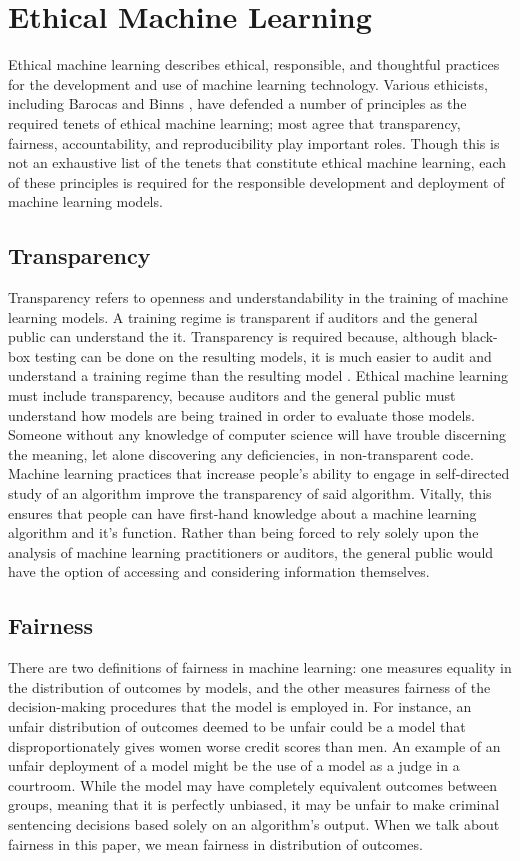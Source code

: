 \documentclass[letterpaper]{article}
\newcommand{\citep}[1]{\cite{#1}}
\begin{document}
\section{Ethical Machine Learning}
Ethical machine learning describes ethical, responsible, and thoughtful practices for the development and use of machine learning technology. Various ethicists, including Barocas  and Binns , have defended a number of principles as the required tenets of ethical machine learning; most agree that transparency, fairness, accountability, and reproducibility play important roles. Though this is not an exhaustive list of the tenets that constitute ethical machine learning, each of these principles is required for the responsible development and deployment of machine learning models.

\subsection{Transparency}
Transparency refers to openness and understandability in the training of machine learning models. A training regime is transparent if auditors and the general public can understand the it. Transparency is required because, although black-box testing can be done on the resulting models, it is much easier to audit and understand a training regime than the resulting model \citep{DeLaat2018}. Ethical machine learning must include transparency, because auditors and the general public must understand how models are being trained in order to evaluate those models. Someone without any knowledge of computer science will have trouble discerning the meaning, let alone discovering any deficiencies, in non-transparent code. Machine learning practices that increase people's ability to engage in self-directed study of an algorithm improve the transparency of said algorithm. Vitally, this ensures that people can have first-hand knowledge about a machine learning algorithm and it's function. Rather than being forced to rely solely upon the analysis of machine learning practitioners or auditors, the general public would have the option of accessing and considering information themselves.

\subsection{Fairness}
There are two definitions of fairness in machine learning: one measures equality in the distribution of outcomes by models, and the other measures fairness of the decision-making procedures that the model is employed in. For instance, an unfair distribution of outcomes deemed to be unfair could be a model that disproportionately gives women worse credit scores than men. An example of an unfair deployment of a model might be the use of a model as a judge in a courtroom. While the model may have completely equivalent outcomes between groups, meaning that it is perfectly unbiased, it may be unfair to make criminal sentencing decisions based solely on an algorithm's output. When we talk about fairness in this paper, we mean fairness in distribution of outcomes. 
\end{document}
